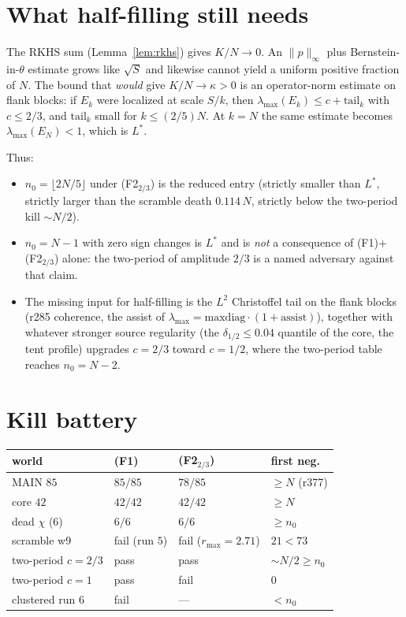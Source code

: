 \documentclass[11pt]{article}
\theoremstyle{remark}
\begin{document}
\section{What half-filling still needs}\label{sec:half}

The RKHS sum (Lemma~\ref{lem:rkhs}) gives $K/N\to 0$.  An
$\lVert p\rVert_\infty$ plus Bernstein-in-$\theta$ estimate
grows like $\sqrt{S}$ and likewise cannot yield a uniform
positive fraction of $N$.  The bound that \emph{would} give
$K/N\to\kappa>0$ is an operator-norm estimate on flank blocks:
if $E_k$ were localized at scale $S/k$, then
$\lambda_{\max}(E_k)\le c+\mathrm{tail}_k$ with $c\le 2/3$, and
$\mathrm{tail}_k$ small for $k\le (2/5)N$.  At $k=N$ the same
estimate becomes $\lambda_{\max}(E_N)<1$, which is $L^*$.

Thus:

\begin{itemize}
\item $n_0=\lfloor 2N/5\rfloor$ under (F2$_{2/3}$) is the reduced
entry (strictly smaller than $L^*$, strictly larger than the
scramble death $0.114\,N$, strictly below the two-period kill
$\sim N/2$).
\item $n_0=N-1$ with zero sign changes is $L^*$ and is
\emph{not} a consequence of (F1)+(F2$_{2/3}$) alone: the
two-period of amplitude $2/3$ is a named adversary against
that claim.
\item The missing input for half-filling is the $L^2$
Christoffel tail on the flank blocks (r285 coherence, the
assist of $\lambda_{\max}=\mathrm{maxdiag}\cdot(1+\mathrm{assist})$),
together with whatever stronger source regularity (the
$\delta_{1/2}\le 0.04$ quantile of the core, the tent profile)
upgrades $c=2/3$ toward $c=1/2$, where the two-period table
reaches $n_0=N-2$.
\end{itemize}

\section{Kill battery}\label{sec:kill}

\begin{center}
\begin{tabular}{@{}llll@{}}
\toprule
world & (F1) & (F2$_{2/3}$) & first neg.\\
\midrule
MAIN $85$ & $85/85$ & $78/85$ & $\ge N$ (r377)\\
core $42$ & $42/42$ & $42/42$ & $\ge N$\\
dead $\chi$ (6) & $6/6$ & $6/6$ & $\ge n_0$\\
scramble w9 & fail (run $5$) & fail ($r_{\max}=2.71$) & $21<73$\\
two-period $c=2/3$ & pass & pass & $\sim N/2\ge n_0$\\
two-period $c=1$ & pass & fail & $0$\\
clustered run $6$ & fail & --- & $<n_0$\\
\bottomrule
\end{tabular}
\end{center}
\end{document}
